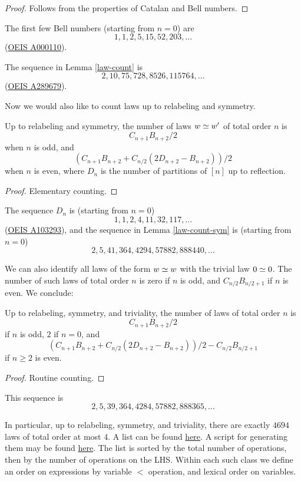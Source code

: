\begin{proof} Follows from the properties of Catalan and Bell numbers.
\end{proof}

The first few Bell numbers (starting from $n=0$) are
$$ 1, 1, 2, 5, 15, 52, 203, \dots$$
(\href{https://oeis.org/A000110}{OEIS A000110}).

The sequence in Lemma \ref{law-count} is
$$ 2, 10, 75, 728, 8526, 115764, \dots$$
(\href{https://oeis.org/A289679}{OEIS A289679}).

Now we would also like to count laws up to relabeling and symmetry.

\begin{lemma}\label{law-count-sym} Up to relabeling and symmetry, the number of laws $w \simeq w'$ of total order $n$ is
$$ C_{n+1} B_{n+2}/2$$
when $n$ is odd, and
$$ (C_{n+1} B_{n+2} + C_{n/2} (2D_{n+2} - B_{n+2}))/2$$
when $n$ is even, where $D_n$ is the number of partitions of $[n]$ up to reflection.
\end{lemma}

\begin{proof} Elementary counting.
\end{proof}

The sequence $D_n$ is (starting from $n=0$)
$$ 1, 1, 2, 4, 11, 32, 117, \dots$$
(\href{https://oeis.org/A103293}{OEIS A103293}), and the sequence in Lemma \ref{law-count-sym} is (starting from $n=0$)
$$ 2, 5, 41, 364, 4294, 57882, 888440, \dots$$

We can also identify all laws of the form $w \simeq w$ with the trivial law $0 \simeq 0$.  The number of such laws of total order $n$ is zero if $n$ is odd, and $C_{n/2} B_{n/2+1}$ if $n$ is even.  We conclude:

\begin{lemma}  Up to relabeling, symmetry, and triviality, the number of laws of total order $n$ is
$$ C_{n+1} B_{n+2}/2$$
if $n$ is odd, $2$ if $n = 0$, and
$$ (C_{n+1} B_{n+2} + C_{n/2} (2D_{n+2} - B_{n+2}))/2 - C_{n/2} B_{n/2+1}$$
if $n \geq 2$ is even.
\end{lemma}

\begin{proof} Routine counting.
\end{proof}

This sequence is
$$2, 5, 39, 364, 4284, 57882, 888365, \dots$$

In particular, up to relabeling, symmetry, and triviality, there are exactly $4694$ laws of total order at most $4$.  A list can be found \href{https://github.com/teorth/equational_theories/blob/main/data/equations.txt}{here}.  A script for generating them may be found \href{https://github.com/teorth/equational_theories/blob/main/scripts/generate_eqs_list.py}{here}.  The list is sorted by the total number of operations, then by the number of operations on the LHS. Within each such class we define an order on expressions by variable $<$ operation, and lexical order on variables.

